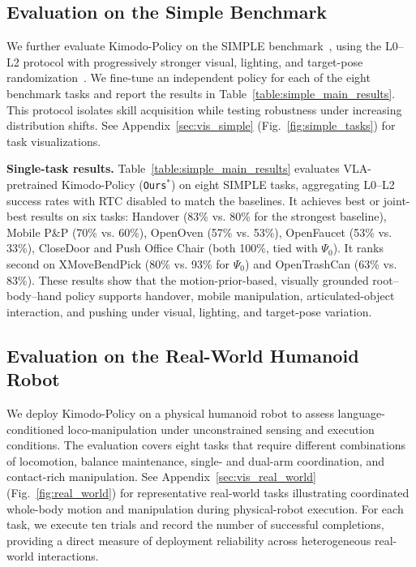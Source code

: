 \subsection{Evaluation on the Simple Benchmark}
\label{sec:exp_simple}
We further evaluate Kimodo-Policy on the SIMPLE benchmark~\cite{simple}, using the L0--L2 protocol with progressively stronger visual, lighting, and target-pose randomization~\cite{simple}. We fine-tune an independent policy for each of the eight benchmark tasks and report the results in Table~\ref{table:simple_main_results}. This protocol isolates skill acquisition while testing robustness under increasing distribution shifts. See Appendix~\ref{sec:vis_simple} (Fig.~\ref{fig:simple_tasks}) for task visualizations.



\textbf{Single-task results.} Table~\ref{table:simple_main_results} evaluates VLA-pretrained Kimodo-Policy (\texttt{Ours}$^{*}$) on eight SIMPLE tasks, aggregating L0--L2 success rates with RTC disabled to match the baselines. It achieves best or joint-best results on six tasks: Handover (83\% vs. 80\% for the strongest baseline), Mobile P\&P (70\% vs. 60\%), OpenOven (57\% vs. 53\%), OpenFaucet (53\% vs. 33\%), CloseDoor and Push Office Chair (both 100\%, tied with $\Psi_0$). It ranks second on XMoveBendPick (80\% vs. 93\% for $\Psi_0$) and OpenTrashCan (63\% vs. 83\%). These results show that the motion-prior-based, visually grounded root--body--hand policy supports handover, mobile manipulation, articulated-object interaction, and pushing under visual, lighting, and target-pose variation.



\subsection{Evaluation on the Real-World Humanoid Robot}
\label{sec:exp_real}
We deploy Kimodo-Policy on a physical humanoid robot to assess language-conditioned loco-manipulation under unconstrained sensing and execution conditions. The evaluation covers eight tasks that require different combinations of locomotion, balance maintenance, single- and dual-arm coordination, and contact-rich manipulation. See Appendix~\ref{sec:vis_real_world} (Fig.~\ref{fig:real_world}) for representative real-world tasks illustrating coordinated whole-body motion and manipulation during physical-robot execution. For each task, we execute ten trials and record the number of successful completions, providing a direct measure of deployment reliability across heterogeneous real-world interactions.



